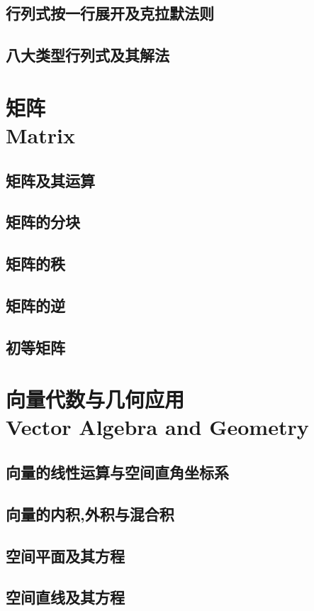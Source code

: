 \documentclass[9pt,a4paper]{book}
\begin{document}
\section{行列式按一行展开及克拉默法则}
\section{八大类型行列式及其解法}
\subsection{}

\chapter{矩阵\\Matrix}
\section{矩阵及其运算}
\section{矩阵的分块}
\section{矩阵的秩}
\section{矩阵的逆}
\section{初等矩阵}
\chapter{向量代数与几何应用\\Vector Algebra and Geometry}
\section{向量的线性运算与空间直角坐标系}
\section{向量的内积,外积与混合积}
\section{空间平面及其方程}
\section{空间直线及其方程}
\end{document}
